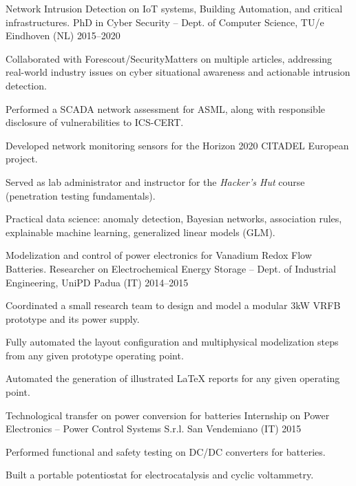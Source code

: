 
\begin{cventries}
    \cventry%
        {Network Intrusion Detection on IoT systems, Building Automation, and critical infrastructures.} %
        {PhD in Cyber Security -- Dept. of Computer Science, TU/e} %
        {Eindhoven (NL)} %
        {2015--2020} %
        {\begin{cvitems}
            \item Collaborated with Forescout/SecurityMatters on multiple articles, addressing real-world industry issues on cyber situational awareness and actionable intrusion detection.
            \item Performed a SCADA network assessment for ASML, along with responsible disclosure of vulnerabilities to ICS-CERT.
            \item Developed network monitoring sensors for the Horizon 2020 CITADEL European project.
            \item Served as lab administrator and instructor for the \emph{Hacker's Hut} course (penetration testing fundamentals).
            \item Practical data science: anomaly detection, Bayesian networks, association rules, explainable machine learning, generalized linear models (GLM).
        \end{cvitems}}


    \cventry%
        {Modelization and control of power electronics for Vanadium Redox Flow Batteries.}
        {Researcher on Electrochemical Energy Storage -- Dept. of Industrial Engineering, UniPD}
        {Padua (IT)}
        {2014--2015}
        {\begin{cvitems}
            \item Coordinated a small research team to design and model a modular 3kW VRFB prototype and its power supply.
            \item Fully automated the layout configuration and multiphysical modelization steps from any given prototype operating point.
            \item Automated the generation of illustrated LaTeX reports for any given operating point.
        \end{cvitems}}

    \cventry%
        {Technological transfer on power conversion for batteries}
        {Internship on Power Electronics -- Power Control Systems S.r.l.}
        {San Vendemiano (IT)}
        {2015}
        {\begin{cvitems}
            \item Performed functional and safety testing on DC/DC converters for batteries.
            \item Built a portable potentiostat for electrocatalysis and cyclic voltammetry.
        \end{cvitems}}


\end{cventries}
